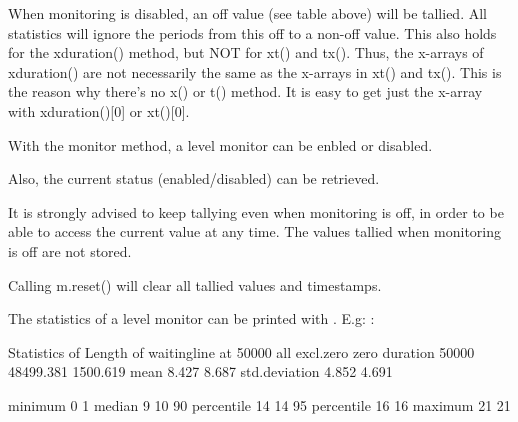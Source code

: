 \documentclass[letterpaper,10pt,english]{sphinxmanual}
\begin{document}
When monitoring is disabled, an off value (see table above) will be tallied. All statistics will ignore the periods from this
off to a non-off value. This also holds for the xduration() method, but NOT for xt() and tx(). Thus,
the x-arrays of xduration() are not necessarily the same as the x-arrays in xt() and tx(). This is
the reason why there’s no x() or t() method. 
It is easy to get just the x-array with xduration(){[}0{]} or xt(){[}0{]}.

With the monitor method, a level monitor can be enbled or disabled.

Also, the current status (enabled/disabled) can be retrieved.

\begin{sphinxVerbatim}[commandchars=\\\{\}]
  
  
 
\end{sphinxVerbatim}

It is strongly advised to keep tallying even when monitoring is off, in order to be able to access the current value at any time. The values tallied when monitoring is off
are not stored.

Calling m.reset() will clear all tallied values and timestamps.

The statistics of a level monitor can be printed with .
E.g: :

\begin{sphinxVerbatim}[commandchars=\\\{\}]
Statistics of Length of waitingline at     50000
                        all    excl.zero         zero
\PYGZhy{}\PYGZhy{}\PYGZhy{}\PYGZhy{}\PYGZhy{}\PYGZhy{}\PYGZhy{}\PYGZhy{}\PYGZhy{}\PYGZhy{}\PYGZhy{}\PYGZhy{}\PYGZhy{}\PYGZhy{} \PYGZhy{}\PYGZhy{}\PYGZhy{}\PYGZhy{}\PYGZhy{}\PYGZhy{}\PYGZhy{}\PYGZhy{}\PYGZhy{}\PYGZhy{}\PYGZhy{}\PYGZhy{} \PYGZhy{}\PYGZhy{}\PYGZhy{}\PYGZhy{}\PYGZhy{}\PYGZhy{}\PYGZhy{}\PYGZhy{}\PYGZhy{}\PYGZhy{}\PYGZhy{}\PYGZhy{} \PYGZhy{}\PYGZhy{}\PYGZhy{}\PYGZhy{}\PYGZhy{}\PYGZhy{}\PYGZhy{}\PYGZhy{}\PYGZhy{}\PYGZhy{}\PYGZhy{}\PYGZhy{}
duration          50000        48499.381     1500.619
mean                  8.427        8.687
std.deviation         4.852        4.691

minimum               0            1
median                9           10
90\PYGZpc{} percentile       14           14
95\PYGZpc{} percentile       16           16
maximum              21           21
\end{sphinxVerbatim}
\end{document}
